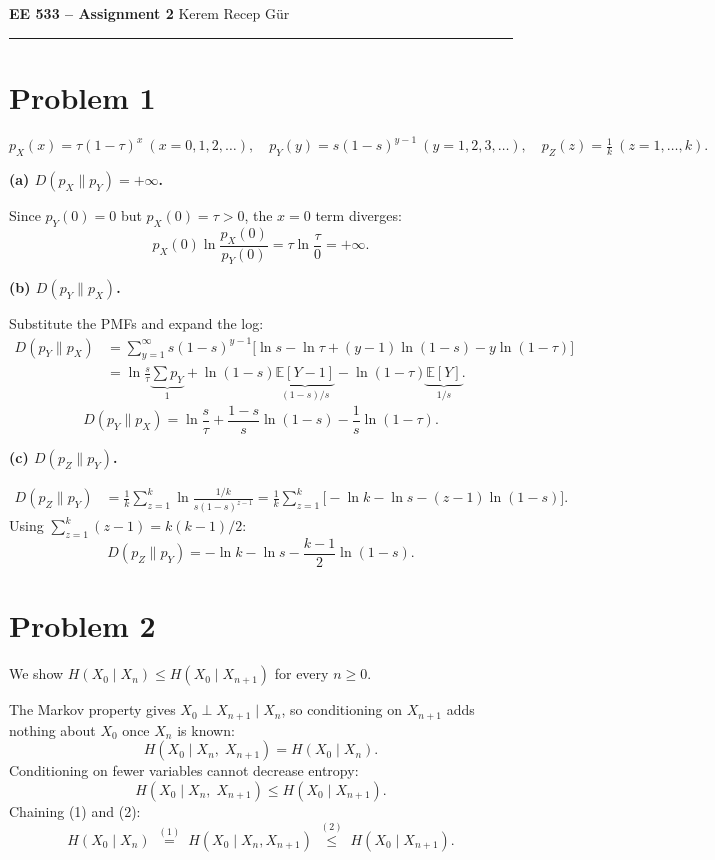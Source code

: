 \documentclass[11pt,a4paper]{article}
\begin{document}
\begin{center}
{\large\textbf{EE 533 -- Assignment 2}} \quad Kerem Recep Gür 
\end{center}
\medskip\hrule\bigskip

\section*{Problem 1}

\[
  p_X(x)=\tau(1-\tau)^x\ (x=0,1,2,\ldots),
  \quad
  p_Y(y)=s(1-s)^{y-1}\ (y=1,2,3,\ldots),
  \quad
  p_Z(z)=\tfrac{1}{k}\ (z=1,\ldots,k).
\]

\medskip
\textbf{(a) $D(p_X\|p_Y) = +\infty$.}

Since $p_Y(0)=0$ but $p_X(0)=\tau>0$, the $x=0$ term diverges:
\[
  p_X(0)\ln\frac{p_X(0)}{p_Y(0)} = \tau\ln\frac{\tau}{0} = +\infty.
\]

\medskip
\textbf{(b) $D(p_Y\|p_X)$.}

Substitute the PMFs and expand the log:
\begin{align*}
  D(p_Y\|p_X)
  &= \sum_{y=1}^{\infty} s(1-s)^{y-1}
     \bigl[\ln s - \ln\tau + (y-1)\ln(1-s) - y\ln(1-\tau)\bigr]\\
  &= \ln\!\tfrac{s}{\tau}\underbrace{\sum p_Y}_{1}
   + \ln(1-s)\underbrace{\mathbb{E}[Y-1]}_{(1-s)/s}
   - \ln(1-\tau)\underbrace{\mathbb{E}[Y]}_{1/s}.
\end{align*}
\[
  \boxed{D(p_Y\|p_X) = \ln\frac{s}{\tau} + \frac{1-s}{s}\ln(1-s) - \frac{1}{s}\ln(1-\tau).}
\]

\medskip
\textbf{(c) $D(p_Z\|p_Y)$.}

\begin{align*}
  D(p_Z\|p_Y)
  &= \frac{1}{k}\sum_{z=1}^{k}\ln\frac{1/k}{s(1-s)^{z-1}}
   = \frac{1}{k}\sum_{z=1}^{k}\bigl[-\ln k-\ln s-(z-1)\ln(1-s)\bigr].
\end{align*}
Using $\sum_{z=1}^{k}(z-1)=k(k-1)/2$:
\[
  \boxed{D(p_Z\|p_Y) = -\ln k - \ln s - \frac{k-1}{2}\ln(1-s).}
\]

\section*{Problem 2}

We show $H(X_0\mid X_n)\le H(X_0\mid X_{n+1})$ for every $n\ge 0$.

The Markov property gives $X_0\perp X_{n+1}\mid X_n$, so conditioning on $X_{n+1}$ adds nothing about $X_0$ once $X_n$ is known:
\[
  H(X_0\mid X_n,\;X_{n+1}) = H(X_0\mid X_n). \tag{1}
\]
Conditioning on fewer variables cannot decrease entropy:
\[
  H(X_0\mid X_n,\;X_{n+1}) \le H(X_0\mid X_{n+1}). \tag{2}
\]
Chaining (1) and (2):
\[
  H(X_0\mid X_n)
  \;\overset{(1)}{=}\;
  H(X_0\mid X_n,X_{n+1})
  \;\overset{(2)}{\le}\;
  H(X_0\mid X_{n+1}).
\]
\end{document}
